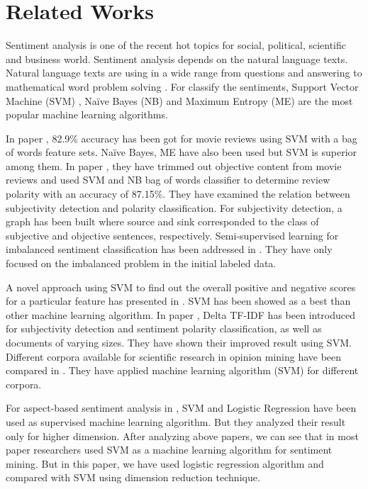 \documentclass[10pt, conference]{IEEEtran}
\begin{document}
	\section{Related Works}
	Sentiment analysis is one of the recent hot topics for social, political, scientific and business world. Sentiment analysis depends on the natural language texts. Natural language texts are using in a wide range from questions and answering to mathematical word problem solving \cite{b3}. For classify the sentiments, Support Vector Machine (SVM) \cite{b4, b5, b6}, Naïve Bayes (NB) \cite{b7, b8} and Maximum Entropy (ME) \cite{b9, b10} are the most popular machine learning algorithms.
	
	In paper \cite{b11}, 82.9\% accuracy has been got for movie reviews using SVM with a bag of words feature sets. Naïve Bayes, ME have also been used but SVM is superior among them. In paper \cite{b12}, they have trimmed out objective content from movie reviews and used SVM and NB bag of words classifier to determine review polarity with an accuracy of 87.15\%. They have examined the relation between subjectivity detection and polarity classification. For subjectivity detection, a graph has been built where source and sink corresponded to the class of subjective and objective sentences, respectively. Semi-supervised learning for imbalanced sentiment classification has been addressed in \cite{b13}. They have only focused on the imbalanced problem in the initial labeled data.
	
	A novel approach using SVM to find out the overall positive and negative scores for a particular feature has presented in \cite{b14}. SVM has been showed as a best than other machine learning algorithm. In paper \cite{b15}, Delta TF-IDF has been introduced for subjectivity detection and sentiment polarity classification, as well as documents of varying sizes. They have shown their improved result using SVM. Different corpora available for scientific research in opinion mining have been compared in \cite{b16}. They have applied machine learning algorithm (SVM) for different corpora.
	
	For aspect-based sentiment analysis in \cite{b17}, SVM and Logistic Regression \cite{b21} have been used as supervised machine learning algorithm. But they analyzed their result only for higher dimension. After analyzing above papers, we can see that in most paper researchers used SVM as a machine learning algorithm for sentiment mining. But in this paper, we have used logistic regression algorithm and compared with SVM using dimension reduction technique.
	
\end{document}
